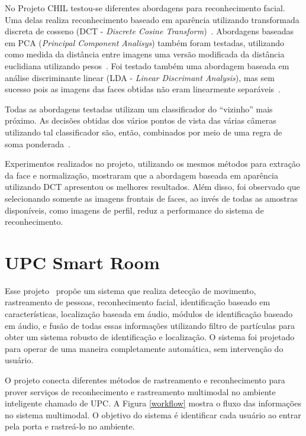 No Projeto CHIL testou-se diferentes abordagens para reconhecimento facial. Uma delas realiza reconhecimento baseado em aparência utilizando transformada discreta de cosseno (DCT - \textit{Discrete Cosine Transform})~\cite{chilref6, chilref7}. Abordagens baseadas em PCA (\textit{Principal Component Analisys}) também foram testadas, utilizando como medida da distância entre imagens uma versão modificada da distância euclidiana utilizando pesos~\cite{chilref8, chilref9}.  Foi testado também uma abordagem baseada em análise discriminante linear (LDA - \textit{Linear Discrimant Analysis}), mas sem sucesso pois as imagens das faces obtidas não eram linearmente separáveis~\cite{chilref8, chilref9}. 

Todas as abordagens testadas utilizam um classificador do ``vizinho'' mais próximo. As decisões obtidas dos vários pontos de vista das várias câmeras utilizando tal classificador são, então, combinados por meio de uma regra de soma ponderada~\cite{chilref8, chilref9}.

Experimentos realizados no projeto, utilizando os mesmos métodos para extração da face e normalização, mostraram que a abordagem baseada em aparência utilizando DCT apresentou os melhores resultados. Além disso, foi observado que selecionando somente as imagens frontais de faces, ao invés de todas as amostras disponíveis, como imagens de perfil, reduz a performance do sistema de reconhecimento. 


\section{UPC Smart Room}

Esse projeto~\cite{salah} propõe um sistema que realiza detecção de movimento, rastreamento de pessoas, reconhecimento facial, identificação baseado em características, localização baseada em áudio, módulos de identificação baseado em áudio, e fusão de todas essas informações utilizando filtro de partículas para obter um sistema robusto de identificação e localização. O sistema foi projetado para operar de uma maneira completamente automática, sem intervenção do usuário.

O projeto conecta diferentes métodos de rastreamento e reconhecimento para prover serviços de reconhecimento e rastreamento multimodal no ambiente inteligente chamado de UPC.  A Figura \ref{workflow} mostra o fluxo das informações no sistema multimodal. O objetivo do sistema é identificar cada usuário ao entrar pela porta e rastreá-lo no ambiente. 

